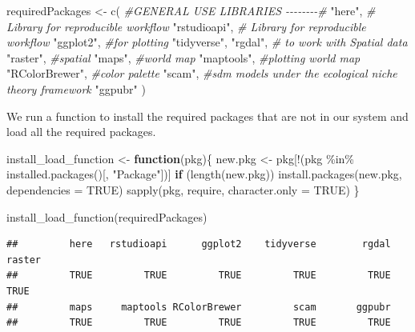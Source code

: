 \documentclass[
]{book}
\newenvironment{Shaded}{\begin{snugshade}}{\end{snugshade}}
\newcommand{\AttributeTok}[1]{\textcolor[rgb]{0.77,0.63,0.00}{#1}}
\newcommand{\CommentTok}[1]{\textcolor[rgb]{0.56,0.35,0.01}{\textit{#1}}}
\newcommand{\ConstantTok}[1]{\textcolor[rgb]{0.00,0.00,0.00}{#1}}
\newcommand{\ControlFlowTok}[1]{\textcolor[rgb]{0.13,0.29,0.53}{\textbf{#1}}}
\newcommand{\FunctionTok}[1]{\textcolor[rgb]{0.00,0.00,0.00}{#1}}
\newcommand{\NormalTok}[1]{#1}
\newcommand{\OtherTok}[1]{\textcolor[rgb]{0.56,0.35,0.01}{#1}}
\newcommand{\SpecialCharTok}[1]{\textcolor[rgb]{0.00,0.00,0.00}{#1}}
\newcommand{\StringTok}[1]{\textcolor[rgb]{0.31,0.60,0.02}{#1}}
\begin{document}
\begin{Shaded}
\begin{Highlighting}[]
\NormalTok{requiredPackages }\OtherTok{\textless{}{-}} \FunctionTok{c}\NormalTok{(}
  \CommentTok{\#GENERAL USE LIBRARIES {-}{-}{-}{-}{-}{-}{-}{-}\#}
  \StringTok{"here"}\NormalTok{, }\CommentTok{\# Library for reproducible workflow}
  \StringTok{"rstudioapi"}\NormalTok{,  }\CommentTok{\# Library for reproducible workflow}
  \StringTok{"ggplot2"}\NormalTok{, }\CommentTok{\#for plotting}
  \StringTok{"tidyverse"}\NormalTok{, }
  \StringTok{"rgdal"}\NormalTok{, }\CommentTok{\# to work with Spatial data}
  \StringTok{"raster"}\NormalTok{, }\CommentTok{\#spatial }
  \StringTok{"maps"}\NormalTok{, }\CommentTok{\#world map}
  \StringTok{"maptools"}\NormalTok{, }\CommentTok{\#plotting world map}
  \StringTok{"RColorBrewer"}\NormalTok{, }\CommentTok{\#color palette}
  \StringTok{"scam"}\NormalTok{, }\CommentTok{\#sdm models under the ecological niche theory framework}
  \StringTok{"ggpubr"}
\NormalTok{  )}
\end{Highlighting}
\end{Shaded}

We run a function to install the required packages that are not in our system and load all the required packages.

\begin{Shaded}
\begin{Highlighting}[]
\NormalTok{install\_load\_function }\OtherTok{\textless{}{-}} \ControlFlowTok{function}\NormalTok{(pkg)\{}
\NormalTok{  new.pkg }\OtherTok{\textless{}{-}}\NormalTok{ pkg[}\SpecialCharTok{!}\NormalTok{(pkg }\SpecialCharTok{\%in\%} \FunctionTok{installed.packages}\NormalTok{()[, }\StringTok{"Package"}\NormalTok{])]}
  \ControlFlowTok{if}\NormalTok{ (}\FunctionTok{length}\NormalTok{(new.pkg))}
    \FunctionTok{install.packages}\NormalTok{(new.pkg, }\AttributeTok{dependencies =} \ConstantTok{TRUE}\NormalTok{)}
  \FunctionTok{sapply}\NormalTok{(pkg, require, }\AttributeTok{character.only =} \ConstantTok{TRUE}\NormalTok{)}
\NormalTok{\}}

\FunctionTok{install\_load\_function}\NormalTok{(requiredPackages)}
\end{Highlighting}
\end{Shaded}

\begin{verbatim}
##         here   rstudioapi      ggplot2    tidyverse        rgdal       raster 
##         TRUE         TRUE         TRUE         TRUE         TRUE         TRUE 
##         maps     maptools RColorBrewer         scam       ggpubr 
##         TRUE         TRUE         TRUE         TRUE         TRUE
\end{verbatim}
\end{document}
